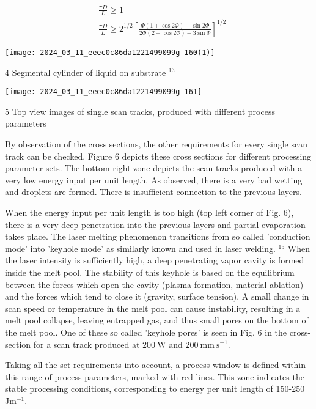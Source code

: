 \documentclass[10pt]{article}
\begin{document}
$$
\begin{aligned}
& \frac{\pi D}{L} \geq 1 \\
& \frac{\pi D}{L} \geq 2^{1 / 2}\left[\frac{\Phi(1+\cos 2 \Phi)-\sin 2 \Phi}{2 \Phi(2+\cos 2 \Phi)-3 \sin \Phi}\right]^{1 / 2}
\end{aligned}
$$

\begin{center}
\texttt{[image: 2024\_03\_11\_eeec0c86da1221499099g-160(1)]}
\end{center}

4 Segmental cylinder of liquid on substrate ${ }^{13}$

\begin{center}
\texttt{[image: 2024\_03\_11\_eeec0c86da1221499099g-161]}
\end{center}

5 Top view images of single scan tracks, produced with different process parameters

By observation of the cross sections, the other requirements for every single scan track can be checked. Figure 6 depicts these cross sections for different processing parameter sets. The bottom right zone depicts the scan tracks produced with a very low energy input per unit length. As observed, there is a very bad wetting and droplets are formed. There is insufficient connection to the previous layers.

When the energy input per unit length is too high (top left corner of Fig. 6), there is a very deep penetration into the previous layers and partial evaporation takes place. The laser melting phenomenon transitions from so called 'conduction mode' into 'keyhole mode' as similarly known and used in laser welding. ${ }^{15}$ When the laser intensity is sufficiently high, a deep penetrating vapor cavity is formed inside the melt pool. The stability of this keyhole is based on the equilibrium between the forces which open the cavity (plasma formation, material ablation) and the forces which tend to close it (gravity, surface tension). A small change in scan speed or temperature in the melt pool can cause instability, resulting in a melt pool collapse, leaving entrapped gas, and thus small pores on the bottom of the melt pool. One of these so called 'keyhole pores' is seen in Fig. 6 in the cross-section for a scan track produced at $200 \mathrm{~W}$ and $200 \mathrm{~mm} \mathrm{~s}^{-1}$.

Taking all the set requirements into account, a process window is defined within this range of process parameters, marked with red lines. This zone indicates the stable processing conditions, corresponding to energy per unit length of 150-250 $\mathrm{J} \mathrm{m}^{-1}$.
\end{document}
